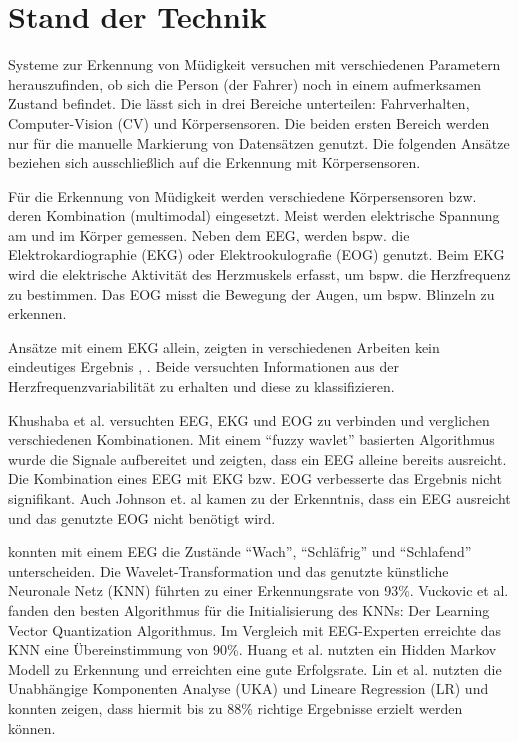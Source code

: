 {\section{Stand der Technik}
\label{chap:state}
Systeme zur Erkennung von Müdigkeit versuchen mit verschiedenen Parametern herauszufinden, ob sich die Person (der Fahrer) noch in einem aufmerksamen Zustand befindet. Die lässt sich in drei Bereiche unterteilen: Fahrverhalten, Computer-Vision (CV) und Körpersensoren. Die beiden ersten Bereich werden nur für die manuelle Markierung von Datensätzen genutzt. Die folgenden Ansätze beziehen sich ausschließlich auf die Erkennung mit Körpersensoren.

Für die Erkennung von Müdigkeit werden verschiedene Körpersensoren bzw. deren Kombination (multimodal) eingesetzt. Meist werden elektrische Spannung am und im Körper gemessen. 
Neben dem EEG, werden bspw. die Elektrokardiographie (EKG) oder Elektrookulografie (EOG) genutzt. Beim EKG wird die elektrische Aktivität des Herzmuskels erfasst, um bspw. die  Herzfrequenz zu bestimmen. Das EOG misst die Bewegung der Augen, um bspw. Blinzeln zu erkennen.

Ansätze mit einem EKG allein, zeigten in verschiedenen Arbeiten kein eindeutiges Ergebnis \cite{Vicente_6164509}, \cite{Rogado_4913155}. Beide versuchten Informationen aus der Herzfrequenzvariabilität zu erhalten und diese zu klassifizieren.

Khushaba et al. \cite{Khushaba_5580017} versuchten EEG, EKG und EOG zu verbinden und verglichen verschiedenen Kombinationen. Mit einem "`fuzzy wavlet"' basierten Algorithmus wurde die Signale aufbereitet und zeigten, dass ein EEG alleine bereits ausreicht. Die Kombination eines EEG mit EKG bzw. EOG verbesserte das Ergebnis nicht signifikant. Auch Johnson et. al \cite{Johnson11} kamen zu der Erkenntnis, dass ein EEG ausreicht und das genutzte EOG nicht benötigt wird. 

\cite{Subasi:2005:ARA:1707423.1707550} konnten mit einem EEG die Zustände "`Wach"', "`Schläfrig"' und "`Schlafend"' unterscheiden. Die Wavelet-Transformation und das genutzte künstliche Neuronale Netz (KNN) führten zu einer Erkennungsrate von 93\%. Vuckovic et al. fanden den besten Algorithmus für die Initialisierung des KNNs: Der Learning Vector Quantization Algorithmus. Im Vergleich mit EEG-Experten erreichte das KNN eine Übereinstimmung von 90\%. Huang et al. \cite{Huang_548971} nutzten ein Hidden Markov Modell zu Erkennung und erreichten eine gute Erfolgsrate.
Lin et al. \cite{Lin05eeg-baseddrowsiness} nutzten die Unabhängige Komponenten Analyse (UKA) und Lineare Regression (LR) und konnten zeigen, dass hiermit  bis zu 88\% richtige Ergebnisse erzielt werden können. 

}

